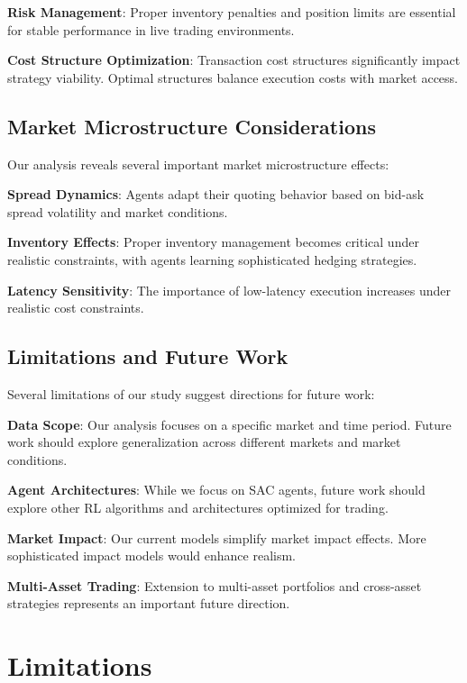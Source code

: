 \documentclass[11pt,a4paper]{article}
\begin{document}
\textbf{Risk Management}: Proper inventory penalties and position limits are essential for stable performance in live trading environments.

\textbf{Cost Structure Optimization}: Transaction cost structures significantly impact strategy viability. Optimal structures balance execution costs with market access.

\subsection{Market Microstructure Considerations}

Our analysis reveals several important market microstructure effects:

\textbf{Spread Dynamics}: Agents adapt their quoting behavior based on bid-ask spread volatility and market conditions.

\textbf{Inventory Effects}: Proper inventory management becomes critical under realistic constraints, with agents learning sophisticated hedging strategies.

\textbf{Latency Sensitivity}: The importance of low-latency execution increases under realistic cost constraints.

\subsection{Limitations and Future Work}

Several limitations of our study suggest directions for future work:

\textbf{Data Scope}: Our analysis focuses on a specific market and time period. Future work should explore generalization across different markets and market conditions.

\textbf{Agent Architectures}: While we focus on SAC agents, future work should explore other RL algorithms and architectures optimized for trading.

\textbf{Market Impact}: Our current models simplify market impact effects. More sophisticated impact models would enhance realism.

\textbf{Multi-Asset Trading}: Extension to multi-asset portfolios and cross-asset strategies represents an important future direction.
\
\

\section{Limitations}
\label{sec:limitations}
\end{document}
